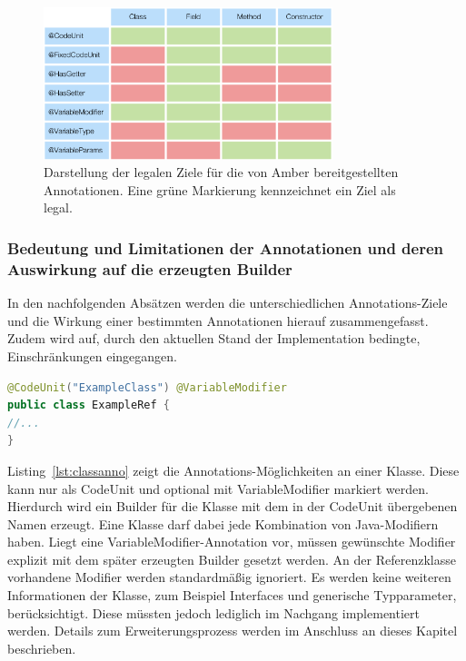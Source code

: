 \documentclass[12pt,oneside,a4paper,parskip]{scrbook}
\begin{document}
\begin{figure}[htbp]
	\centering
	\includegraphics[width=0.75\textwidth]{bilder/tblAnnoTrgt}
	\caption{Darstellung der legalen Ziele für die von Amber bereitgestellten Annotationen. Eine grüne Markierung kennzeichnet ein Ziel als legal.}
	\label{fig:tblAnnoTrgt}
\end{figure}

\subsubsection{Bedeutung und Limitationen der Annotationen und deren Auswirkung auf die erzeugten Builder}

In den nachfolgenden Absätzen werden die unterschiedlichen Annotations-Ziele und die Wirkung einer bestimmten Annotationen hierauf zusammengefasst. Zudem wird auf, durch den aktuellen Stand der Implementation bedingte, Einschränkungen eingegangen.

\begin{lstlisting}[label=lst:classanno,
language=java,
firstnumber=1,
caption=Darstellung der Annotations-Möglichkeiten an einer Klasse.]
@CodeUnit("ExampleClass") @VariableModifier
public class ExampleRef {
//...
}
\end{lstlisting}

Listing~\ref{lst:classanno} zeigt die Annotations-Möglichkeiten an einer Klasse. Diese kann nur als CodeUnit und optional mit VariableModifier markiert werden. Hierdurch wird ein Builder für die Klasse mit dem in der CodeUnit übergebenen Namen erzeugt. Eine Klasse darf dabei jede Kombination von Java-Modifiern haben. Liegt eine VariableModifier-Annotation vor, müssen gewünschte Modifier explizit mit dem später erzeugten Builder gesetzt werden. An der Referenzklasse vorhandene Modifier werden standardmäßig ignoriert. Es werden keine weiteren Informationen der Klasse, zum Beispiel Interfaces und generische Typparameter, berücksichtigt. Diese müssten jedoch lediglich im Nachgang implementiert werden. Details zum Erweiterungsprozess werden im Anschluss an dieses Kapitel beschrieben.
\end{document}
